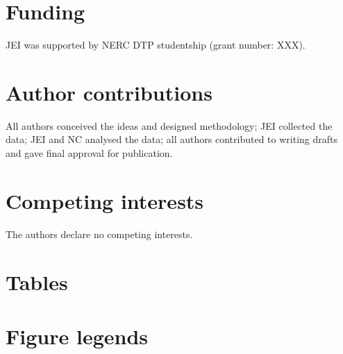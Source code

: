 \documentclass[a4paper, 12pt]{article}
\begin{document}
\section{Funding}
JEI was supported by NERC DTP studentship (grant number: XXX).

\section{Author contributions}
All authors conceived the ideas and designed methodology; JEI collected the data; JEI and NC analysed the data; all authors contributed to writing drafts and gave final approval for publication.

\section{Competing interests}
The authors declare no competing interests.





\newpage
\section{Tables}

\begin{landscape}
  
\end{landscape}


\section{Figure legends}

\end{document}
